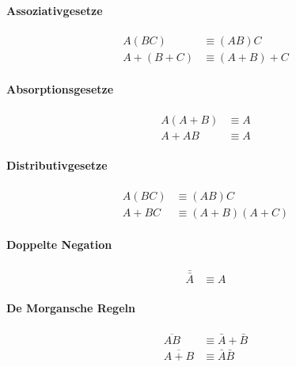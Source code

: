 \documentclass[../main.tex]{subfiles}
\begin{document}
        \paragraph{Assoziativgesetze}
            \begin{subequations}
                \begin{align}
                    A (BC) &\equiv (AB) C\\
                    A + (B + C) &\equiv (A + B) + C
                \end{align}
            \end{subequations}
        
        \paragraph{Absorptionsgesetze}
            \begin{subequations}
                \begin{align}
                    A (A + B) &\equiv A\\
                    A + AB &\equiv A
                \end{align}
            \end{subequations}
        
        \paragraph{Distributivgesetze}
            \begin{subequations}
                \begin{align}
                    A (BC) &\equiv (AB) C\\
                    A + BC &\equiv (A + B)(A + C)
                \end{align}
            \end{subequations}
        
        \paragraph{Doppelte Negation}
            \begin{align}
                \bar{\bar{A}} &\equiv A
            \end{align}
        
        \paragraph{De Morgansche Regeln}
            \begin{subequations}
                \begin{align}
                    \overline{AB} &\equiv \bar{A} + \bar{B}\\
                    \overline{A + B} &\equiv \bar{A}\bar{B}
                \end{align}
            \end{subequations}
        
\end{document}
